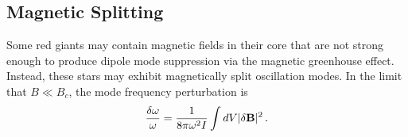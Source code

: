 \subsection{Magnetic Splitting}

Some red giants may contain magnetic fields in their core that are not strong enough to produce dipole mode suppression via the magnetic greenhouse effect. Instead, these stars may exhibit magnetically split oscillation modes. In the limit that $B \ll B_c$, the mode frequency perturbation is \cite{Unno_1989}
\begin{equation}
\label{eqn:dommag}
\frac{\delta \omega}{\omega} = \frac{1}{8 \pi \omega^2 I} \int d V | \delta {\bf B} |^2 \, .
\end{equation}